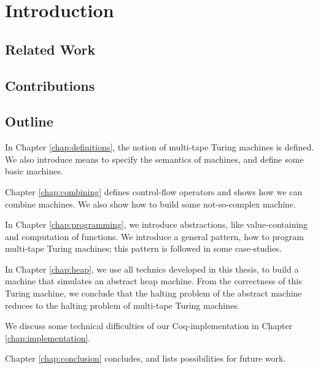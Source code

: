 \chapter{Introduction}
\label{chap:intro}

\section{Related Work}
\label{sec:relatedwork}

\section{Contributions}
\label{sec:contributions}

\section{Outline}
\label{sec:outline}

In Chapter \ref{chap:definitions}, the notion of multi-tape Turing machines is defined.  We also introduce means to specify the semantics of machines,
and define some basic machines.

Chapter \ref{chap:combining} defines control-flow operators and shows how we can combine machines.  We also show how to build some not-so-complex
machine.

In Chapter \ref{chap:programming}, we introduce abstractions, like value-containing and computation of functions.  We introduce a general pattern, how
to program multi-tape Turing machines; this pattern is followed in some case-studies.

In Chapter \ref{chap:heap}, we use all technics developed in this thesis, to build a machine that simulates an abstract heap machine.  From the
correctness of this Turing machine, we conclude that the halting problem of the abstract machine reduces to the halting problem of multi-tape Turing
machines.

We discuss some technical difficulties of our Coq-implementation in Chapter \ref{chap:implementation}.

Chapter \ref{chap:conclusion} concludes, and lists possibilities for future work.



